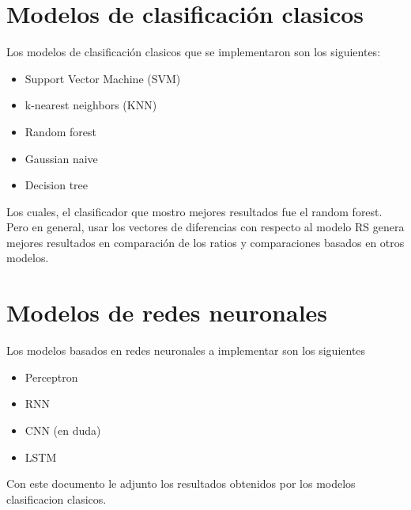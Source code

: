 \section{Modelos de clasificación clasicos}

Los modelos de clasificación clasicos que se implementaron son los siguientes:

\begin{itemize}
  \item Support Vector Machine (SVM)
  \item k-nearest neighbors (KNN)
  \item Random forest
  \item Gaussian naive
  \item Decision tree
\end{itemize}

Los cuales, el clasificador que mostro mejores resultados fue el random forest. Pero en general, usar los vectores de diferencias con respecto al modelo RS genera mejores resultados en comparación de los ratios y comparaciones basados en otros modelos.

\section{Modelos de redes neuronales}

Los modelos basados en redes neuronales a implementar son los siguientes

\begin{itemize}
  \item Perceptron
  \item RNN
  \item CNN (en duda)
  \item LSTM
\end{itemize}

Con este documento le adjunto los resultados obtenidos por los modelos clasificacion clasicos.
